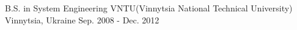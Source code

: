 

\begin{cventries}

  \cventry
    {B.S. in System Engineering} %
    {VNTU(Vinnytsia National Technical University)} %
    {Vinnytsia, Ukraine} %
    {Sep. 2008 - Dec. 2012} %
	{}
\end{cventries}

